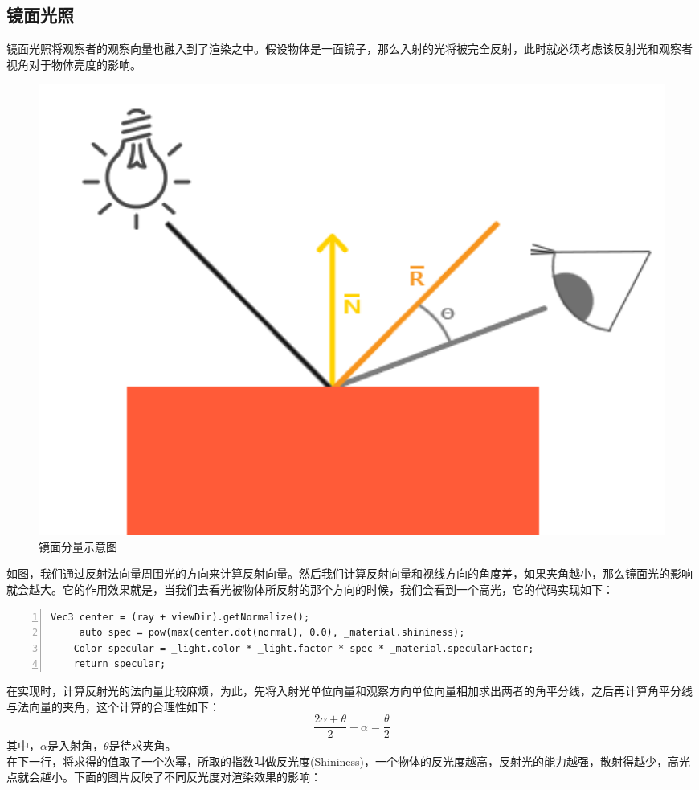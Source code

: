 \begin{spacing}{2.5}
	\subsection{镜面光照}
	
	镜面光照将观察者的观察向量也融入到了渲染之中。假设物体是一面镜子，那么入射的光将被完全反射，此时就必须考虑该反射光和观察者视角对于物体亮度的影响。
	
    \begin{figure}[H]
    	\centering
		\includegraphics[width=1.0\textwidth]{images/specular_light.png}
		\caption{镜面分量示意图}
		\label{specular_light}
    \end{figure}
    
    如图，我们通过反射法向量周围光的方向来计算反射向量。然后我们计算反射向量和视线方向的角度差，如果夹角越小，那么镜面光的影响就会越大。它的作用效果就是，当我们去看光被物体所反射的那个方向的时候，我们会看到一个高光，它的代码实现如下：
    \begin{lstlisting}[language={[ANSI]C},numbers=left,numberstyle=\tiny,%frame=shadowbox,
   rulesepcolor=\color{red!20!green!20!blue!20},
   keywordstyle=\color{blue!70!black},
   commentstyle=\color{blue!90!},
   basicstyle=\ttfamily]
   Vec3 center = (ray + viewDir).getNormalize();
	 auto spec = pow(max(center.dot(normal), 0.0), _material.shininess);
    Color specular = _light.color * _light.factor * spec * _material.specularFactor;
    return specular;
	\end{lstlisting}
    
    在实现时，计算反射光的法向量比较麻烦，为此，先将入射光单位向量和观察方向单位向量相加求出两者的角平分线，之后再计算角平分线与法向量的夹角，这个计算的合理性如下：
   		\begin{equation}
   			\frac{2\alpha+\theta}{2} - \alpha = \frac{\theta}{2}
   		\end{equation}
    其中，$\alpha$是入射角，$\theta$是待求夹角。\\
    在下一行，将求得的值取了一个次幂，所取的指数叫做反光度(Shininess)，一个物体的反光度越高，反射光的能力越强，散射得越少，高光点就会越小。下面的图片反映了不同反光度对渲染效果的影响：
    

\end{spacing}
